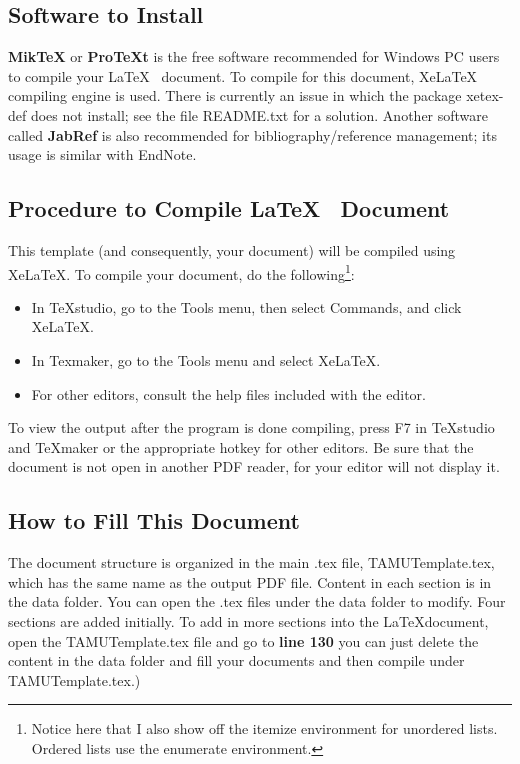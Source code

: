 \subsection*{Software to Install}

\textbf{MikTeX} or \textbf{ProTeXt} is the free software recommended for Windows PC users to
compile your \LaTeX ~ document. To compile for this document, XeLaTeX compiling engine
is used. There is currently an issue in which the package xetex-def does not install; see the file README.txt for a solution. Another software called \textbf{JabRef} is also recommended for bibliography/reference management; its usage is similar with EndNote.

\subsection*{Procedure to Compile \LaTeX ~ Document}

This template (and consequently, your document) will be compiled using XeLaTeX. To compile your document, do the following\footnote{Notice here that I also show off the itemize environment for unordered lists. Ordered lists use the enumerate environment.}:

\begin{itemize}
	\item In TeXstudio, go to the Tools menu, then select Commands, and click XeLaTeX.
	
	\item In Texmaker, go to the Tools menu and select XeLaTeX.
	
	\item For other editors, consult the help files included with the editor.
\end{itemize}

To view the output after the program is done compiling, press F7 in TeXstudio and TeXmaker or the appropriate hotkey for other editors. Be sure that the document is not open in another PDF reader, for your editor will not display it.

\subsection{How to Fill This Document}
The document structure is organized in the main .tex file, TAMUTemplate.tex,
which has the same name as the output PDF file. Content in each section is in the data folder. You can open the .tex files under the data folder to modify. Four sections
are added initially. To add in more sections into the \LaTeX document, open the
TAMUTemplate.tex file and go to \textbf{line 130} you can just delete the content in the data folder and fill your documents and then compile under TAMUTemplate.tex.)

